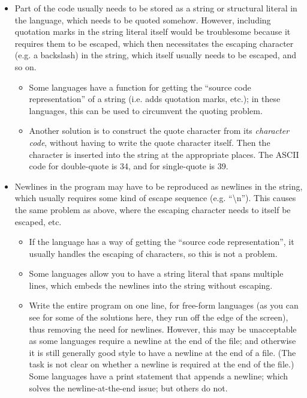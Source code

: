 \begin{itemize}
\item
  Part of the code usually needs to be stored as a string or structural
  literal in the language, which needs to be quoted somehow. However,
  including quotation marks in the string literal itself would be
  troublesome because it requires them to be escaped, which then
  necessitates the escaping character (e.g. a backslash) in the string,
  which itself usually needs to be escaped, and so on.

  \begin{itemize}
  \item
    Some languages have a function for getting the ``source code
    representation'' of a string (i.e. adds quotation marks, etc.); in
    these languages, this can be used to circumvent the quoting problem.
  \item
    Another solution is to construct the quote character from its
    \emph{character code}, without having to
    write the quote character itself. Then the character is inserted
    into the string at the appropriate places. The ASCII code for
    double-quote is 34, and for single-quote is 39.
  \end{itemize}
\item
  Newlines in the program may have to be reproduced as newlines in the
  string, which usually requires some kind of escape sequence (e.g.
  ``\textbackslash{}n''). This causes the same problem as above, where
  the escaping character needs to itself be escaped, etc.

  \begin{itemize}
  \item
    If the language has a way of getting the ``source code
    representation'', it usually handles the escaping of characters, so
    this is not a problem.
  \item
    Some languages allow you to have a string literal that spans
    multiple lines, which embeds the newlines into the string without
    escaping.
  \item
    Write the entire program on one line, for free-form languages (as
    you can see for some of the solutions here, they run off the edge of
    the screen), thus removing the need for newlines. However, this may
    be unacceptable as some languages require a newline at the end of
    the file; and otherwise it is still generally good style to have a
    newline at the end of a file. (The task is not clear on whether a
    newline is required at the end of the file.) Some languages have a
    print statement that appends a newline; which solves the
    newline-at-the-end issue; but others do not.
  \end{itemize}
\end{itemize}

